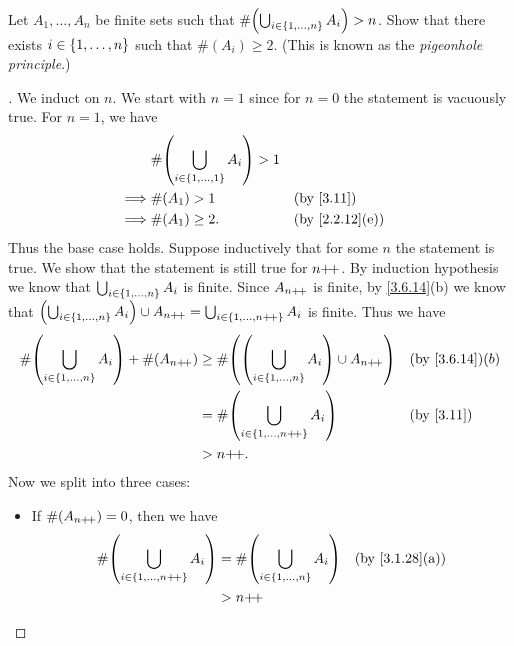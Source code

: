 \begin{ex}\label{ex:3.6.10}
	Let \(A_1, \dots, A_n\) be finite sets such that \(\#\pa{\bigcup_{i \in \set{1, \dots, n}} A_i} > n\).
	Show that there exists \(i \in \left\lbrace1, \dots, n\right\rbrace\) such that \(\#(A_i) \geq 2\).
	(This is known as the \emph{pigeonhole principle}.)
\end{ex}

\begin{proof}[]
	We induct on \(n\).
	We start with \(n = 1\) since for \(n = 0\) the statement is vacuously true.
	For \(n = 1\), we have
	\begin{align*}
		         & \#\pa{\bigcup_{i \in \set{1, \dots, 1}} A_i} > 1                     \\
		\implies & \#(A_1) > 1                                      &  & \by{3.11}      \\
		\implies & \#(A_1) \geq 2.                                  &  & \by{2.2.12}[e]
	\end{align*}
	Thus the base case holds.
	Suppose inductively that for some \(n\) the statement is true.
	We show that the statement is still true for \(n{+}\!{+}\).
	By induction hypothesis we know that \(\bigcup_{i \in \left\lbrace1, \dots, n\right\rbrace} A_i\) is finite.
	Since \(A_{n{+}\!{+}}\) is finite, by \cref{3.6.14}(b) we know that \(\left\lparen\bigcup_{i \in \left\lbrace1, \dots, n\right\rbrace} A_i\right\rparen \cup A_{n{+}\!{+}} = \bigcup_{i \in \left\lbrace1, \dots, n{+}\!{+}\right\rbrace} A_i\) is finite.
	Thus we have
	\begin{align*}
		\#\pa{\bigcup_{i \in \set{1, \dots, n}} A_i} + \#(A_{n\pp}) & \geq \#\pa{\pa{\bigcup_{i \in \set{1, \dots, n}} A_i} \cup A_{n\pp}} &  & \by{3.6.14}(b) \\
		                                                            & = \#\pa{\bigcup_{i \in \set{1, \dots, n\pp}} A_i}                    &  & \by{3.11}      \\
		                                                            & > n\pp.
	\end{align*}
	Now we split into three cases:
	\begin{itemize}
		\item If \(\#(A_{n{+}\!{+}}) = 0\), then we have
		      \begin{align*}
			      \#\pa{\bigcup_{i \in \set{1, \dots, n\pp}} A_i} & = \#\pa{\bigcup_{i \in \set{1, \dots, n}} A_i} &  & \by{3.1.28}[a] \\
			                                                      & > n\pp                                                             \\

\end{align*}
\end{itemize}
\end{proof}
